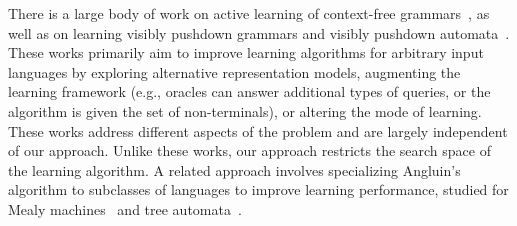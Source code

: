 There is a large body of work on active learning of context-free grammars~\cite{Knobe76, Shapiro82, Angluin87a, Sakakibara92, DBLP:conf/emnlp/SennhauserB18, GrammaticalInference, DBLP:conf/pldi/Bastani0AL17, DBLP:conf/pldi/BendrissouGZ22, DBLP:conf/kbse/KulkarniLS21, DBLP:conf/sigsoft/WuJYBSPX19}, as well as on learning visibly pushdown grammars and visibly pushdown automata~\cite{DBLP:phd/dnb/Isberner15, mfcs22, ValidatingXMLwithVPA, DBLP:conf/icgi/BarbotBFHKLN0Y21, DBLP:journals/pacmpl/JiaT24, DBLP:journals/corr/abs-2603-11648}.
These works primarily aim to improve learning algorithms for arbitrary input languages by exploring alternative representation models, 
augmenting the learning framework 
 (e.g., oracles can answer additional types of queries, or the algorithm is given the set of non-terminals), 
or altering the mode of learning. 
These works address different aspects of the problem and are largely independent of our approach.
Unlike these works, our approach restricts the search space of the learning algorithm.
A related approach involves specializing Angluin's algorithm to subclasses of languages to improve learning performance, 
studied for Mealy machines~\cite{graybox-learning, DBLP:conf/dlt/BerthonBPR21, DBLP:conf/fossacs/LabbafGHM23, DBLP:journals/corr/abs-2405-08647, ProductAutomata} and 
tree automata~\cite{DBLP:conf/fossacs/HeerdtKR021, BjorklundBE17}. 

